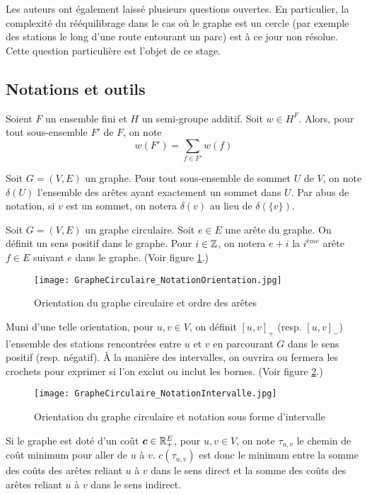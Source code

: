 Les auteurs ont également laissé plusieurs questions ouvertes. En particulier, la complexité du rééquilibrage dans le cas où le graphe est un cercle (par exemple des stations le long d'une route entourant un parc) est à ce jour non résolue. Cette question particulière est l'objet de ce stage.

\subsection{Notations et outils}

Soient $F$ un ensemble fini et $H$ un semi-groupe additif. Soit $w \in H^F$. Alors, pour tout sous-ensemble $F'$ de $F$, on note $$w(F') = \sum_{f \in F'} w(f)$$

Soit $G=(V,E)$ un graphe. Pour tout sous-ensemble de sommet $U$ de $V$, on note $\delta(U)$ l'ensemble des arêtes ayant exactement un sommet dans $U$. Par abus de notation, si $v$ est un sommet, on notera $\delta(v)$ au lieu de $\delta(\{v\})$.

Soit $G=(V,E)$ un graphe circulaire. Soit $e \in E$ une arête du graphe. On définit un sens positif dans le graphe. Pour $i \in \mathbb{Z}$, on notera $e+i$ la $i^{ème}$ arête $f \in E$ suivant $e$ dans le graphe. (Voir figure \ref{Notation orientation graphe circulaire}.)
\begin{figure}[ht]
  \centering
  \texttt{[image: GrapheCirculaire\_NotationOrientation.jpg]}
  \caption{Orientation du graphe circulaire et ordre des arêtes}
  \label{Notation orientation graphe circulaire}
\end{figure}

Muni d'une telle orientation, pour $u,v \in V$, on définit $\left[ u,v \right]_+$ (resp. $\left[ u,v \right]_-$) l'ensemble des stations rencontrées entre $u$ et $v$ en parcourant $G$ dans le sens positif (resp. négatif). \`A la manière des intervalles, on ouvrira ou fermera les crochets pour exprimer si l'on exclut ou inclut les bornes. (Voir figure \ref{Notation intervalle graphe}.)
\begin{figure}[ht]
  \centering
  \texttt{[image: GrapheCirculaire\_NotationIntervalle.jpg]}
  \caption{Orientation du graphe circulaire et notation sous forme d'intervalle}
  \label{Notation intervalle graphe}
\end{figure}

Si le graphe est doté d'un coût $\boldsymbol{c} \in \mathbb{R}^E_+$, pour $u,v \in V$, on note $\tau_{u,v}$ le chemin de coût minimum pour aller de $u$ à $v$. $c(\tau_{u,v})$ est donc le minimum entre la somme des coûts des arêtes reliant $u$ à $v$ dans le sens direct et la somme des coûts des arêtes reliant $u$ à $v$ dans le sens indirect.

